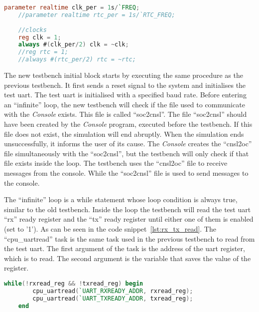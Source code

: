 \begin{lstlisting}[language=Verilog, caption={System clock and \acrshort{rtc} generation in \textit{Verilog}.}, label=lst:clk_rtc_gen]
    parameter realtime clk_per = 1s/`FREQ;
    //parameter realtime rtc_per = 1s/`RTC_FREQ;
 
    //clocks
    reg clk = 1;
    always #(clk_per/2) clk = ~clk;
    //reg rtc = 1;
    //always #(rtc_per/2) rtc = ~rtc;
\end{lstlisting}

The new testbench initial block starts by executing the same procedure as the previous testbench. It first sends a reset signal to the system and initialises the test \acrshort{uart}. The test \acrshort{uart} is initialised with a specified baud rate. Before entering an \enquote{infinite} loop, the new testbench will check if the file used to communicate with the \textit{Console} exists. This file is called \enquote{soc2cnsl}. The file \enquote{soc2cnsl} should have been created by the \textit{Console} program, executed before the testbench. If this file does not exist, the simulation will end abruptly. When the simulation ends unsuccessfully, it informs the user of its cause. The \textit{Console} creates the \enquote{cnsl2oc} file simultaneously with the \enquote{soc2cnsl}, but the testbench will only check if that file exists inside the loop. The testbench uses the \enquote{cnsl2oc} file to receive messages from the console. While the \enquote{soc2cnsl} file is used to send messages to the console.

The \enquote{infinite} loop is a while statement whose loop condition is always true, similar to the old testbench. Inside the loop the testbench will read the test \acrshort{uart} \enquote{rx} ready register and the \enquote{tx} ready register until either one of them is enabled (set to '1'). As can be seen in the code snippet~\ref{lst:rx_tx_read}. The \enquote{cpu\_uartread} task is the same task used in the previous testbench to read from the test \acrshort{uart}. The first argument of the task is the address of the \acrshort{uart} register, which is to read. The second argument is the variable that saves the value of the register.

\begin{lstlisting}[language=Verilog, caption={Read the test \acrshort{uart} \enquote{rx} ready register and the \enquote{tx} ready register.}, label=lst:rx_tx_read]
    while(!rxread_reg && !txread_reg) begin
        cpu_uartread(`UART_RXREADY_ADDR, rxread_reg);
        cpu_uartread(`UART_TXREADY_ADDR, txread_reg);
    end
\end{lstlisting}

